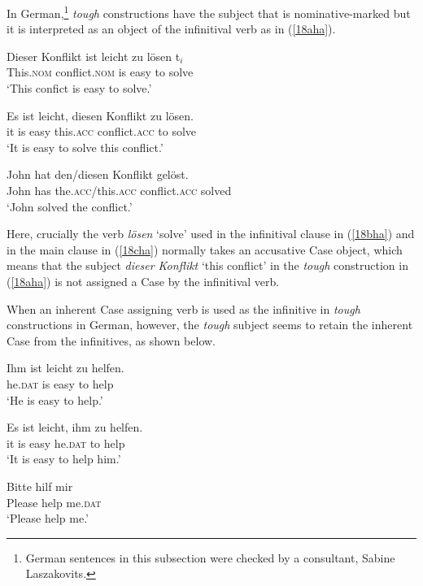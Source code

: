 \documentclass[output=paper]{langscibook}
\begin{document}
In German,\footnote{German sentences in this subsection were checked by a consultant, Sabine Laszakovits.} \textit{tough} constructions have the subject that is nominative-marked but it is interpreted as an object of the infinitival verb as in (\ref{18aha}).

\begin{exe}
\ex \label{18ha}
\begin{xlist}
\ex \label{18aha}
\gll Dieser Konflikt ist  leicht zu lösen t$_{i}$\\
This.\textsc{nom} conflict.\textsc{nom} is easy to solve\\
\glt ‘This confict is easy to solve.’                             

\ex \label{18bha}
\gll Es ist leicht, diesen Konflikt zu lösen.\\
it is easy this.\textsc{acc} conflict.\textsc{acc} to solve\\
\glt ‘It is easy to solve this conflict.'

\ex \label{18cha}
\gll John hat den/diesen  Konflikt gelöst.\\
John has the.\textsc{acc}/this.\textsc{acc} conflict.\textsc{acc} solved\\
\glt ‘John solved the conflict.’

\end{xlist}
\end{exe}

Here, crucially the verb \textit{lösen} ‘solve’ used in the infinitival clause in (\ref{18bha}) and in the main clause in (\ref{18cha}) normally takes an accusative Case object, which means that the subject \textit{dieser Konflikt} ‘this conflict’ in the \textit{tough} construction in (\ref{18aha}) is not assigned a Case by the infinitival verb.

When an inherent Case assigning verb is used as the infinitive in \textit{tough} constructions in German, however, the \textit{tough} subject seems to retain the inherent Case from the infinitives, as shown below.

\begin{exe}
\ex \label{19ha}
\begin{xlist}
\ex \label{19aha}
\gll Ihm ist leicht zu helfen.\\
he.\textsc{dat} is easy to help\\
\glt ‘He is easy to help.’

\ex \label{19bha}
\gll Es ist leicht, ihm zu helfen.\\
it is easy he.\textsc{dat} to help\\
\glt ‘It is easy to help him.’

\end{xlist}

\ex \label{20ha}
\gll Bitte   hilf   mir\\
Please help me.\textsc{dat}\\
\glt ‘Please help me.’
\end{exe}
\end{document}
